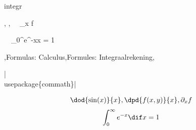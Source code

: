 \copyrightVincent

\begin{saveblock}{integr}
	\begin{highlightblock}[gobble=8]
		, , \partial~~_x f
		
		\int~~_{0}^{\infty}e^{-x}\dif x = 1
	\end{highlightblock}
\end{saveblock}


\begin{frame}
	{\lang,Formulas: Calculus,Formules: Integraalrekening,}

	\hll|\\usepackage\{commath\}|


	\begin{align*}
		\dod{\sin(x)}{x}, \dpd{f(x,y)}{x}, \partial_x f
	\end{align*}
	\begin{align*}
		\int_{0}^{\infty}e^{-x}\dif x = 1
	\end{align*}
\end{frame}

	

		

